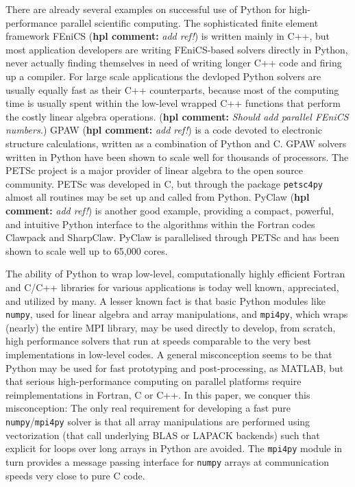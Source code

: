 \documentclass[11pt, oneside]{article}
\newcommand{\hpl}[1]{({\bf hpl comment:} \emph{#1})}
\begin{document}
There are already several examples on successful use of Python for
high-performance parallel scientific computing. The sophisticated
finite element framework FEniCS \hpl{add ref!} is written mainly in
C++, but most application developers are writing FEniCS-based solvers
directly in Python, never actually finding themselves in need of
writing longer C++ code and firing up a compiler. For large scale
applications the devloped Python solvers are usually equally fast as
their C++ counterparts, because most of the computing time is usually
spent within the low-level wrapped C++ functions that perform the
costly linear algebra operations. \hpl{Should add parallel FEniCS numbers.}
GPAW \hpl{add ref!} is a code devoted
to electronic structure calculations, written as a combination of
Python and C. GPAW solvers written in Python have been shown to scale
well for thousands of processors.  The PETSc project is a major
provider of linear algebra to the open source community. PETSc was
developed in C, but through the package \texttt{petsc4py} almost all
routines may be set up and called from Python. PyClaw \hpl{add ref!}
is another good example, providing a compact, powerful, and intuitive
Python interface to the algorithms within the Fortran codes Clawpack
and SharpClaw. PyClaw is parallelised through PETSc and has been shown
to scale well up to 65,000 cores.

The ability of Python to wrap low-level, computationally highly efficient Fortran and C/C++ libraries for various applications is today well known, appreciated, and utilized by many. A lesser known fact is that basic Python modules like \texttt{numpy}, used for linear algebra and array manipulations, and \texttt{mpi4py}, which wraps (nearly) the entire MPI library, may be used directly to develop, from scratch, high performance solvers that run at speeds comparable to the very best implementations in low-level codes. A general misconception seems to be that Python may be used for fast prototyping and post-processing, as MATLAB, but that serious high-performance computing on parallel platforms require reimplementations in Fortran, C or C++. In this paper, we conquer this misconception: The only real requirement for developing a fast pure \texttt{numpy}/\texttt{mpi4py} solver is that all array manipulations are performed using vectorization (that call underlying BLAS or LAPACK backends) such that explicit for loops over long arrays in Python are avoided. The \texttt{mpi4py} module in turn provides a message passing interface for \texttt{numpy} arrays at communication speeds very close to pure C code.
\end{document}
